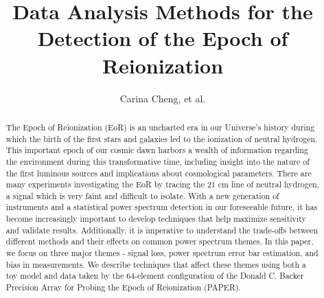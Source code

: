 \documentclass[preprint2,numberedappendix,tighten,twocolappendix]{aastex6}  %
\begin{document}
\title{Data Analysis Methods for the Detection of the Epoch of Reionization}

\author{
Carina Cheng,
et al.
}


	






\begin{abstract}
The Epoch of Reionization (EoR) is an uncharted era in our Universe's history during which the birth of the first stars and galaxies led to the ionization of neutral hydrogen. This important epoch of our cosmic dawn harbors a wealth of information regarding the environment during this transformative time, including insight into the nature of the first luminous sources and implications about cosmological parameters. There are many experiments investigating the EoR by tracing the $21$ cm line of neutral hydrogen, a signal which is very faint and difficult to isolate. With a new generation of instruments and a statistical power spectrum detection in our foreseeable future, it has become increasingly important to develop techniques that help maximize sensitivity and validate results. Additionally, it is imperative to understand the trade-offs between different methods and their effects on common power spectrum themes. In this paper, we focus on three major themes - signal loss, power spectrum error bar estimation, and bias in measurements. We describe techniques that affect these themes using both a toy model and data taken by the 64-element configuration of the Donald C. Backer Precision Array for Probing the Epoch of Reionization (PAPER).
\end{abstract}
\end{document}
